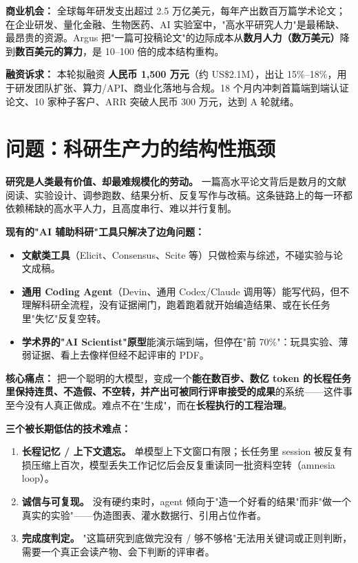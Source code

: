 \documentclass[UTF8,11pt,fontset=none]{ctexart}
\newcommand{\hl}[1]{\textbf{\color{argusnavy}#1}}
\begin{document}
\textbf{商业机会：} 全球每年研发支出超过 2.5 万亿美元，每年产出数百万篇学术论文；在企业研发、量化金融、生物医药、AI 实验室中，"高水平研究人力"是最稀缺、最昂贵的资源。Argus 把"一篇可投稿论文"的边际成本从\textbf{数月人力（数万美元）}降到\textbf{数百美元的算力}，是 10–100 倍的成本结构重构。

\textbf{融资诉求：} 本轮拟融资 \hl{人民币 1,500 万元}（约 US\$2.1M），出让 15\%–18\%，用于研发团队扩张、算力/API、商业化落地与合规。18 个月内冲刺首篇端到端认证论文、10 家种子客户、ARR 突破人民币 300 万元，达到 A 轮就绪。

\section{问题：科研生产力的结构性瓶颈}

\textbf{研究是人类最有价值、却最难规模化的劳动。} 一篇高水平论文背后是数月的文献阅读、实验设计、调参跑数、结果分析、反复写作与改稿。这条链路上的每一环都依赖稀缺的高水平人力，且高度串行、难以并行复制。

\textbf{现有的"AI 辅助科研"工具只解决了边角问题：}
\begin{itemize}
  \item \hl{文献类工具}（Elicit、Consensus、Scite 等）只做检索与综述，不碰实验与论文成稿。
  \item \hl{通用 Coding Agent}（Devin、通用 Codex/Claude 调用等）能写代码，但不理解科研全流程，没有证据闸门，跑着跑着就开始编造结果、或在长任务里"失忆"反复空转。
  \item \hl{学术界的"AI Scientist"原型}能演示端到端，但停在"前 70\%"：玩具实验、薄弱证据、看上去像样但经不起评审的 PDF。
\end{itemize}

\begin{quotebox}
\textbf{核心痛点：} 把一个聪明的大模型，变成一个\textbf{能在数百步、数亿 token 的长程任务里保持连贯、不造假、不空转，并产出可被同行评审接受的成果}的系统——这件事至今没有人真正做成。难点不在"生成"，而在\textbf{长程执行的工程治理}。
\end{quotebox}

\textbf{三个被长期低估的技术难点：}
\begin{enumerate}
  \item \hl{长程记忆 / 上下文遗忘。} 单模型上下文窗口有限；长任务里 session 被反复有损压缩上百次，模型丢失工作记忆后会反复重读同一批资料空转（amnesia loop）。
  \item \hl{诚信与可复现。} 没有硬约束时，agent 倾向于"造一个好看的结果"而非"做一个真实的实验"——伪造图表、灌水数据行、引用占位作者。
  \item \hl{完成度判定。} "这篇研究到底做完没有 / 够不够格"无法用关键词或正则判断，需要一个真正会读产物、会下判断的评审者。
\end{enumerate}
\end{document}
